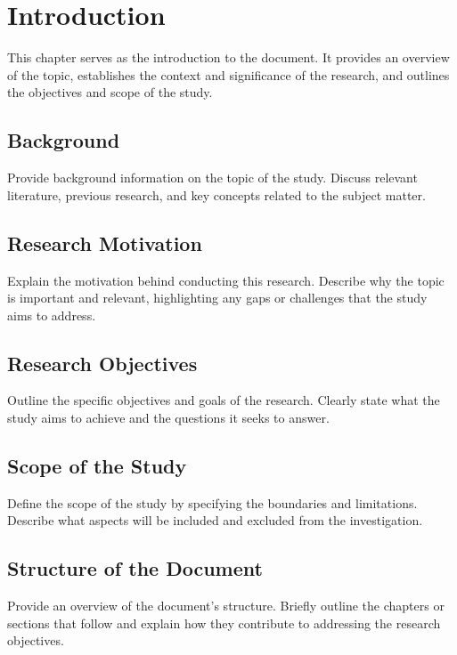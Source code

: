 
	\chapter{Introduction}
	
	This chapter serves as the introduction to the document. It provides an overview of the topic, establishes the context and significance of the research, and outlines the objectives and scope of the study.
	
	\section{Background}
	Provide background information on the topic of the study. Discuss relevant literature, previous research, and key concepts related to the subject matter.
	
	\section{Research Motivation}
	Explain the motivation behind conducting this research. Describe why the topic is important and relevant, highlighting any gaps or challenges that the study aims to address.
	
	\section{Research Objectives}
	Outline the specific objectives and goals of the research. Clearly state what the study aims to achieve and the questions it seeks to answer.
	
	\section{Scope of the Study}
	Define the scope of the study by specifying the boundaries and limitations. Describe what aspects will be included and excluded from the investigation.
	
	\section{Structure of the Document}
	Provide an overview of the document's structure. Briefly outline the chapters or sections that follow and explain how they contribute to addressing the research objectives.
	


